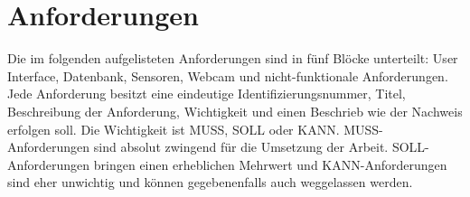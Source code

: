 \section{Anforderungen}
Die im folgenden aufgelisteten Anforderungen sind in fünf Blöcke unterteilt: User Interface, Datenbank, Sensoren, Webcam und nicht-funktionale Anforderungen.
Jede Anforderung besitzt eine eindeutige Identifizierungsnummer, Titel, Beschreibung der Anforderung, Wichtigkeit und einen Beschrieb wie der Nachweis erfolgen soll.
Die Wichtigkeit ist MUSS, SOLL oder KANN. MUSS-Anforderungen sind absolut zwingend für die Umsetzung der Arbeit. SOLL-Anforderungen bringen einen erheblichen Mehrwert und KANN-Anforderungen sind eher unwichtig und können gegebenenfalls auch weggelassen werden.

